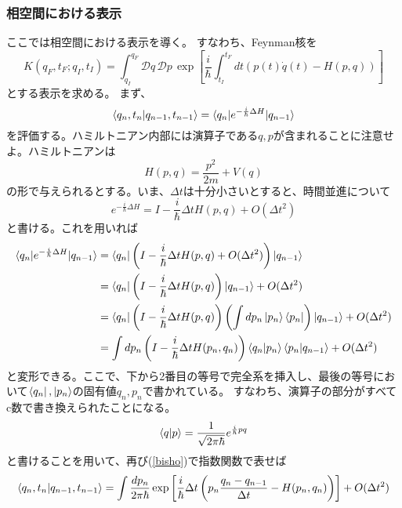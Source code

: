 \documentclass[10pt]{jsarticle}
\newcommand{\kakko}[1]{\left(#1 \right)} %
\newcommand{\kkakko}[1]{\left[ #1 \right]} %
\newcommand{\pms}[1]{\mathcal{D}#1\,}%
\numberwithin{equation}{section}%
\begin{document}
\subsubsection{相空間における表示}
ここでは相空間における表示を導く。
すなわち、Feynman核を
\begin{equation}
  K(q_{F},t_{F};q_{I},t_{I})=\int_{q_I}^{q_{F}} \pms{q}\pms{p}\exp\kkakko{\frac{i}{\hbar}\int_{t_{I}}^{t_{F}}dt\kakko{p(t)\dot{q}(t)-H(p,q)} }
\end{equation}
とする表示を求める。
まず、
\begin{equation}
  \braket{q_{n},t_{n}|q_{n-1},t_{n-1}}=\braket{q_{n}|e^{-\frac{i}{\hbar}\Delta H}|q_{n-1}}
\end{equation}
を評価する。ハミルトニアン内部には演算子である$q,p$が含まれることに注意せよ。ハミルトニアンは
\begin{equation}
  H(p,q)=\frac{p^{2}}{2m}+V(q)
\end{equation}
の形で与えられるとする。いま、$\Delta t$は十分小さいとすると、時間並進について
\begin{equation}
\label{bisho}  e^{-\frac{i}{\hbar}\Delta H}=I-\frac{i}{\hbar}\Delta t H(p,q)+O(\Delta t^{2})
\end{equation}
と書ける。これを用いれば
\begin{align}
  \braket{q_{n}|e^{-\frac{i}{\hbar}\Delta H}|q_{n-1}}&=\braket{q_{n}|\kakko{I-\frac{i}{\hbar}\Delta t H(p,q)+O(\Delta t^{2})}|q_{n-1}}\notag \\
  &=\braket{q_{n}|\kakko{I-\frac{i}{\hbar}\Delta t H(p,q)}|q_{n-1}}+O(\Delta t^{2})\notag \\
  &=\braket{q_{n}|\kakko{I-\frac{i}{\hbar}\Delta t H(p,q)}\kakko{\int dp_{n}\ket{p_{n}}\bra{p_{n}}}|q_{n-1}}+O(\Delta t^{2})\notag \\
  &=\int dp_{n} \kakko{I-\frac{i}{\hbar}\Delta t H(p_{n},q_{n})}\braket{q_{n}|p_{n}}\braket{p_{n}|q_{n-1}}+O(\Delta t^{2})
\end{align}
と変形できる。ここで、下から2番目の等号で完全系を挿入し、最後の等号において$\bra{q_{n}},\ket{p_{n}}$の固有値$q_{n},p_{n}$で書かれている。
すなわち、演算子の部分がすべてc数で書き換えられたことになる。
\begin{equation}
  \braket{q|p}=\frac{1}{\sqrt{2\pi \hbar }}e^{\frac{i}{\hbar}pq}
\end{equation}
と書けることを用いて、再び(\ref{bisho})で指数関数で表せば
\begin{equation}
  \braket{q_{n},t_{n}|q_{n-1},t_{n-1}}=\int \frac{dp_{n}}{2\pi \hbar} \exp\kkakko{\frac{i}{\hbar}\Delta t \kakko{ p_{n}\frac{q_{n}-q_{n-1}}{\Delta t} -H(p_{n},q_{n}) }}+O(\Delta t^{2})
\end{equation}
\end{document}
